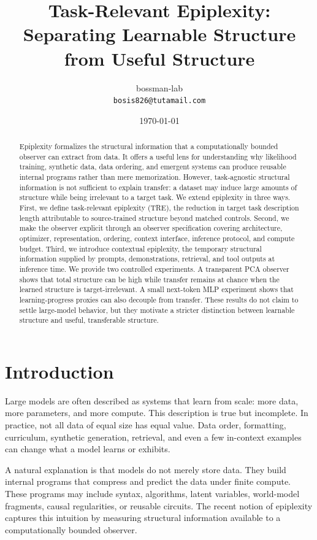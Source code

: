 \documentclass[11pt]{article}
\title{Task-Relevant Epiplexity:\\Separating Learnable Structure from Useful Structure}
\author{bossman-lab\\\texttt{bosis826@tutamail.com}}
\date{\today}
\begin{document}
\maketitle

\begin{abstract}
Epiplexity formalizes the structural information that a computationally bounded observer can extract from data. It offers a useful lens for understanding why likelihood training, synthetic data, data ordering, and emergent systems can produce reusable internal programs rather than mere memorization. However, task-agnostic structural information is not sufficient to explain transfer: a dataset may induce large amounts of structure while being irrelevant to a target task. We extend epiplexity in three ways. First, we define task-relevant epiplexity (TRE), the reduction in target task description length attributable to source-trained structure beyond matched controls. Second, we make the observer explicit through an observer specification covering architecture, optimizer, representation, ordering, context interface, inference protocol, and compute budget. Third, we introduce contextual epiplexity, the temporary structural information supplied by prompts, demonstrations, retrieval, and tool outputs at inference time. We provide two controlled experiments. A transparent PCA observer shows that total structure can be high while transfer remains at chance when the learned structure is target-irrelevant. A small next-token MLP experiment shows that learning-progress proxies can also decouple from transfer. These results do not claim to settle large-model behavior, but they motivate a stricter distinction between learnable structure and useful, transferable structure.
\end{abstract}

\section{Introduction}

Large models are often described as systems that learn from scale: more data, more parameters, and more compute. This description is true but incomplete. In practice, not all data of equal size has equal value. Data order, formatting, curriculum, synthetic generation, retrieval, and even a few in-context examples can change what a model learns or exhibits.

A natural explanation is that models do not merely store data. They build internal programs that compress and predict the data under finite compute. These programs may include syntax, algorithms, latent variables, world-model fragments, causal regularities, or reusable circuits. The recent notion of epiplexity \citep{finzi2026epiplexity} captures this intuition by measuring structural information available to a computationally bounded observer.
\end{document}

